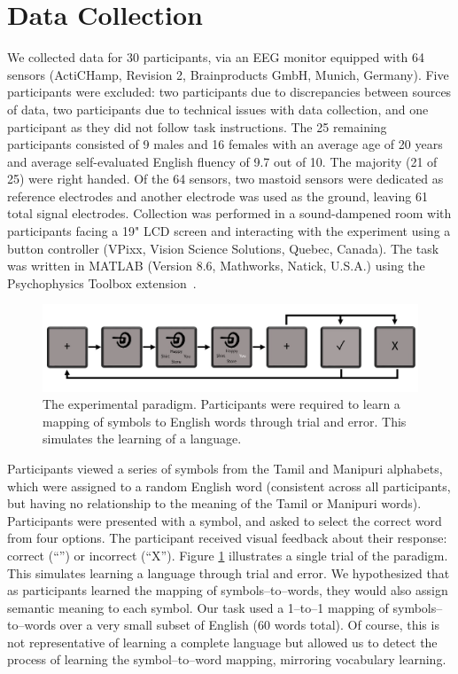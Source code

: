 \section{Data Collection}

We collected data for 30 participants, via an EEG monitor equipped with 64 sensors (ActiCHamp, Revision 2, Brainproducts GmbH, Munich, Germany). Five participants were excluded: two participants due to discrepancies between sources of data, two participants due to technical issues with data collection, and one participant as they did not follow task instructions. The 25 remaining participants consisted of 9 males and 16 females with an average age of 20 years and average self-evaluated English fluency of 9.7 out of 10. The majority (21 of 25) were right handed. Of the 64 sensors, two mastoid sensors were dedicated as reference electrodes and another electrode was used as the ground, leaving 61 total signal electrodes. Collection was performed in a sound-dampened room with participants facing a 19" LCD screen and interacting with the experiment using a button controller (VPixx, Vision Science Solutions, Quebec, Canada). The task was written in MATLAB (Version 8.6, Mathworks, Natick, U.S.A.) using the Psychophysics Toolbox extension~\cite{brainard1997psychophysics}.


\begin{figure}[t]
  \centering
  \includegraphics[width=\linewidth]{figures/experiment}
  \caption{The experimental paradigm. Participants were required to learn a mapping of symbols to English words through trial and error. This simulates the learning of a language.}
  \label{fig:experiment}
\end{figure}

Participants viewed a series of symbols from the Tamil and Manipuri alphabets, which were assigned to a random English word (consistent across all participants, but having no relationship to the meaning of the Tamil or Manipuri words).  Participants were presented with a symbol, and asked to select the correct word from four options. The participant received visual feedback about their response: correct (``\CheckmarkBold'') or incorrect (``X''). Figure \ref{fig:experiment} illustrates a single trial of the paradigm. This simulates learning a language through trial and error. We hypothesized that as participants learned the mapping of symbols--to--words, they would also assign semantic meaning to each symbol. Our task used a 1--to--1 mapping of symbols--to--words over a very small subset of English (60 words total). Of course, this is not representative of learning a complete language but allowed us to detect the process of learning the symbol--to--word mapping, mirroring vocabulary learning.

